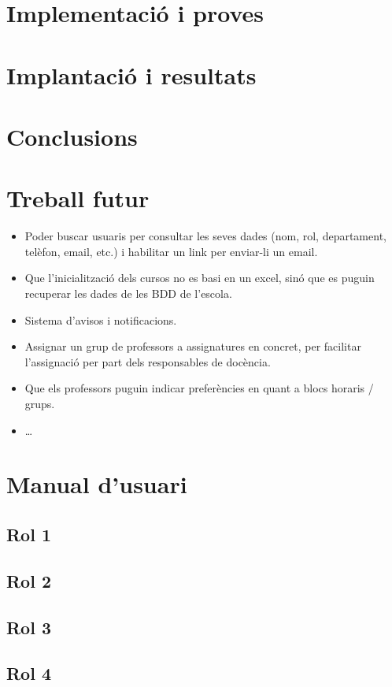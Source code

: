 \documentclass[a4paper,12pt]{ThesisStyle}
\begin{document}
\chapter{Implementació i proves}
\label{cap:implementacio}




\chapter{Implantació i resultats}
\label{cap:implantacio}





\chapter{Conclusions}
\label{cap:conclusions}





\chapter{Treball futur}
\label{cap:treball_futur}

\begin{itemize}
  \item Poder buscar usuaris per consultar les seves dades (nom, rol, departament, telèfon, email, etc.) i habilitar un link per enviar-li un email.
  \item Que l'inicialització dels cursos no es basi en un excel, sinó que es puguin recuperar les dades de les BDD de l'escola.
  \item Sistema d'avisos i notificacions.
  \item Assignar un grup de professors a assignatures en concret, per facilitar l'assignació per part dels responsables de docència.
  \item Que els professors puguin indicar preferències en quant a blocs horaris / grups.
  \item \ldots
\end{itemize}


\backmatter





%

\chapter*{Manual d'usuari}

\section*{Rol 1}



\section*{Rol 2}



\section*{Rol 3}



\section*{Rol 4}
\end{document}
